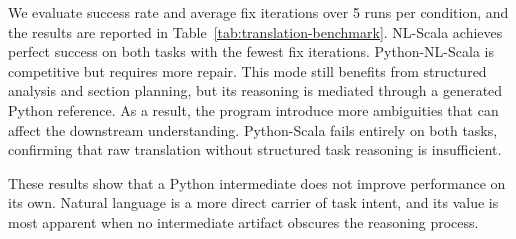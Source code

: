 We evaluate success rate and average fix iterations over 5 runs per condition, and the results are reported in Table~\ref{tab:translation-benchmark}.
NL-Scala achieves perfect success on both tasks with the fewest fix iterations. Python-NL-Scala is competitive but requires more repair. This mode still benefits from structured analysis and section planning, but its reasoning is mediated through a generated Python reference. As
a result, the program introduce more ambiguities that
can affect the downstream understanding. Python-Scala
fails entirely on both tasks, confirming that raw translation without structured task reasoning is insufficient.

These results show that a Python intermediate does not improve
performance on its own. Natural language is a more direct carrier of task intent, and its value is most apparent when no intermediate artifact obscures the reasoning process.
